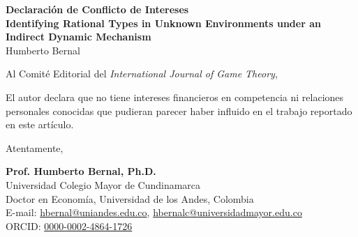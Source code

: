 \documentclass[12pt]{article}
\begin{document}
\singlespacing

\begin{center}
\textbf{Declaración de Conflicto de Intereses} \\
\vspace{1em}
\textbf{Identifying Rational Types in Unknown Environments under an Indirect Dynamic Mechanism} \\
Humberto Bernal
\end{center}

\vspace{3em}

\noindent Al Comité Editorial del \textit{International Journal of Game Theory},

\vspace{2em}

\noindent El autor declara que no tiene intereses financieros en competencia ni relaciones personales conocidas que pudieran parecer haber influido en el trabajo reportado en este artículo.

\vspace{4em}

\begin{flushleft}
Atentamente,

\vspace{3em}

\textbf{Prof. Humberto Bernal, Ph.D.} \\
Universidad Colegio Mayor de Cundinamarca \\
Doctor en Economía, Universidad de los Andes, Colombia \\
E-mail: \href{mailto:hbernal@uniandes.edu.co}{hbernal@uniandes.edu.co}, \href{mailto:hbernalc@universidadmayor.edu.co}{hbernalc@universidadmayor.edu.co} \\
ORCID: \href{https://orcid.org/0000-0002-4864-1726}{0000-0002-4864-1726}
\end{flushleft}
\end{document}
